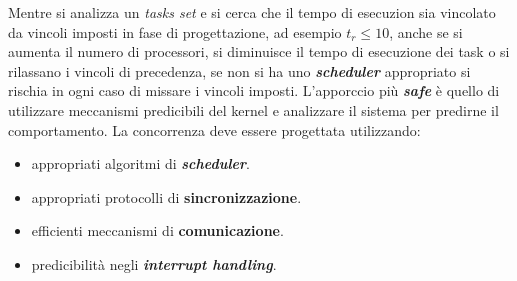 Mentre si analizza un \textit{tasks set} e si cerca che il tempo di esecuzion sia vincolato da vincoli imposti in fase di progettazione, ad esempio $t_r \leq 10$, anche se si aumenta il numero di processori, si diminuisce il tempo di esecuzione dei task o si rilassano i vincoli di precedenza, se non si ha uno \textbf{\textit{scheduler}} appropriato si rischia in ogni caso di missare i vincoli imposti. L'apporccio più \textbf{\textit{safe}} è quello di utilizzare meccanismi predicibili del kernel e analizzare il sistema per predirne il comportamento. La concorrenza deve essere progettata utilizzando:
\begin{itemize}
    \item appropriati algoritmi di \textbf{\textit{scheduler}}.
    \item appropriati protocolli di \textbf{sincronizzazione}.
    \item efficienti meccanismi di \textbf{comunicazione}.
    \item predicibilità negli \textbf{\textit{interrupt handling}}.
\end{itemize}
